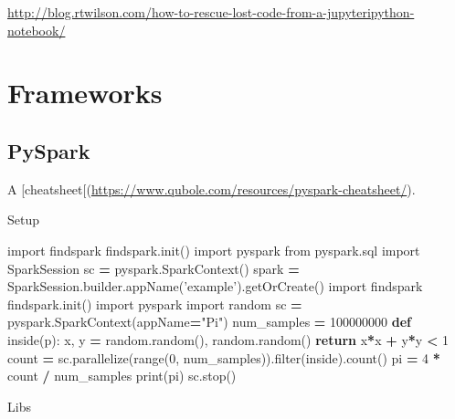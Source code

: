 \documentclass[]{book}
\newenvironment{Shaded}{\begin{snugshade}}{\end{snugshade}}
\newcommand{\KeywordTok}[1]{\textcolor[rgb]{0.13,0.29,0.53}{\textbf{#1}}}
\newcommand{\DecValTok}[1]{\textcolor[rgb]{0.00,0.00,0.81}{#1}}
\newcommand{\StringTok}[1]{\textcolor[rgb]{0.31,0.60,0.02}{#1}}
\newcommand{\ImportTok}[1]{#1}
\newcommand{\ControlFlowTok}[1]{\textcolor[rgb]{0.13,0.29,0.53}{\textbf{#1}}}
\newcommand{\OperatorTok}[1]{\textcolor[rgb]{0.81,0.36,0.00}{\textbf{#1}}}
\newcommand{\BuiltInTok}[1]{#1}
\newcommand{\NormalTok}[1]{#1}
\begin{document}
\url{http://blog.rtwilson.com/how-to-rescue-lost-code-from-a-jupyteripython-notebook/}

\chapter{Frameworks}\label{frameworks}

\section{PySpark}\label{pyspark}

A
{[}cheatsheet{[}(\url{https://www.qubole.com/resources/pyspark-cheatsheet/}).

Setup

\begin{Shaded}
\begin{Highlighting}[]
\ImportTok{import}\NormalTok{ findspark}
\NormalTok{findspark.init()}
\ImportTok{import}\NormalTok{ pyspark}
\ImportTok{from}\NormalTok{ pyspark.sql }\ImportTok{import}\NormalTok{ SparkSession}
\NormalTok{sc }\OperatorTok{=}\NormalTok{ pyspark.SparkContext()}
\NormalTok{spark }\OperatorTok{=}\NormalTok{ SparkSession.builder.appName(}\StringTok{'example'}\NormalTok{).getOrCreate()}
\ImportTok{import}\NormalTok{ findspark}
\NormalTok{findspark.init()}
\ImportTok{import}\NormalTok{ pyspark}
\ImportTok{import}\NormalTok{ random}
\NormalTok{sc }\OperatorTok{=}\NormalTok{ pyspark.SparkContext(appName}\OperatorTok{=}\StringTok{"Pi"}\NormalTok{)}
\NormalTok{num_samples }\OperatorTok{=} \DecValTok{100000000}
\KeywordTok{def}\NormalTok{ inside(p):     }
\NormalTok{    x, y }\OperatorTok{=}\NormalTok{ random.random(), random.random()}
    \ControlFlowTok{return}\NormalTok{ x}\OperatorTok{*}\NormalTok{x }\OperatorTok{+}\NormalTok{ y}\OperatorTok{*}\NormalTok{y }\OperatorTok{<} \DecValTok{1}
\NormalTok{count }\OperatorTok{=}\NormalTok{ sc.parallelize(}\BuiltInTok{range}\NormalTok{(}\DecValTok{0}\NormalTok{, num_samples)).}\BuiltInTok{filter}\NormalTok{(inside).count()}
\NormalTok{pi }\OperatorTok{=} \DecValTok{4} \OperatorTok{*}\NormalTok{ count }\OperatorTok{/}\NormalTok{ num_samples}
\BuiltInTok{print}\NormalTok{(pi)}
\NormalTok{sc.stop()}
\end{Highlighting}
\end{Shaded}

Libs
\end{document}
